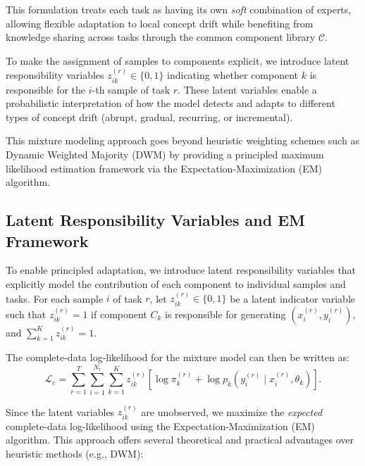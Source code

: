 \documentclass[12pt,a4paper]{article}
\begin{document}
This formulation treats each task as having its own \emph{soft} combination of experts, allowing flexible adaptation to local concept drift while benefiting from knowledge sharing across tasks through the common component library $\mathcal{C}$.

To make the assignment of samples to components explicit, we introduce latent responsibility variables $z_{ik}^{(r)} \in \{0,1\}$ indicating whether component $k$ is responsible for the $i$-th sample of task $r$. These latent variables enable a probabilistic interpretation of how the model detects and adapts to different types of concept drift (abrupt, gradual, recurring, or incremental).

This mixture modeling approach goes beyond heuristic weighting schemes such as Dynamic Weighted Majority (DWM) by providing a principled maximum likelihood estimation framework via the Expectation-Maximization (EM) algorithm.

	
	
	
	





\subsection{Latent Responsibility Variables and EM Framework}

To enable principled adaptation, we introduce latent responsibility variables that explicitly model the contribution of each component to individual samples and tasks. For each sample $i$ of task $r$, let $z_{ik}^{(r)} \in \{0,1\}$ be a latent indicator variable such that $z_{ik}^{(r)}=1$ if component $C_k$ is responsible for generating $(x_i^{(r)}, y_i^{(r)})$, and $\sum_{k=1}^K z_{ik}^{(r)} = 1$.

The complete-data log-likelihood for the mixture model can then be written as:
\begin{equation}
	\mathcal{L}_c = \sum_{r=1}^T \sum_{i=1}^{N_r} \sum_{k=1}^K z_{ik}^{(r)} \left[ \log \pi_k^{(r)} + \log p_k(y_i^{(r)} \mid x_i^{(r)}, \theta_k) \right].
	\label{eq:complete_loglik}
\end{equation}

Since the latent variables $z_{ik}^{(r)}$ are unobserved, we maximize the \emph{expected} complete-data log-likelihood using the Expectation-Maximization (EM) algorithm. This approach offers several theoretical and practical advantages over heuristic methods (e.g., DWM):
\end{document}
